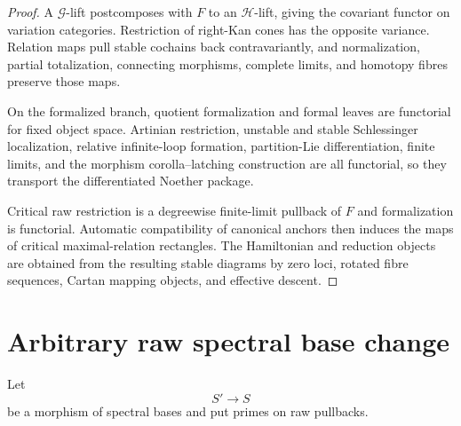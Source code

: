 \begin{proof}
A $\mathcal G$-lift postcomposes with $F$ to an $\mathcal H$-lift, giving the
covariant functor on variation categories.  Restriction of right-Kan cones has the
opposite variance.  Relation maps pull stable cochains back contravariantly, and
normalization, partial totalization, connecting morphisms, complete limits, and
homotopy fibres preserve those maps.

On the formalized branch, quotient formalization and formal leaves are functorial
for fixed object space.  Artinian restriction, unstable and stable Schlessinger
localization, relative infinite-loop formation, partition-Lie differentiation,
finite limits, and the morphism corolla--latching construction are all functorial,
so they transport the differentiated Noether package.

Critical raw restriction is a degreewise finite-limit pullback of $F$ and
formalization is functorial.  Automatic compatibility of canonical anchors then
induces the maps of critical maximal-relation rectangles.  The Hamiltonian and
reduction objects are obtained from the resulting stable diagrams by zero loci,
rotated fibre sequences, Cartan mapping objects, and effective descent.
\end{proof}
\section{Arbitrary raw spectral base change}
\label{sec:symmetry-noether-arbitrary-raw-spectral-base-change}

Let
\[
S'\longrightarrow S
\]
be a morphism of spectral bases and put primes on raw pullbacks.

